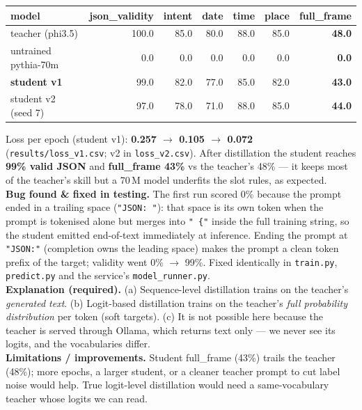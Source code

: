 \documentclass[10pt,a4paper]{article}
\newcommand{\code}[1]{\texttt{\small #1}}
\begin{document}
\begin{center}\small
\begin{tabular}{lrrrrrr}
\toprule
model & json\_validity & intent & date & time & place & full\_frame \\
\midrule
teacher (phi3.5) & 100.0 & 85.0 & 80.0 & 88.0 & 85.0 & \textbf{48.0} \\
untrained pythia-70m & 0.0 & 0.0 & 0.0 & 0.0 & 0.0 & \textbf{0.0} \\
\textbf{student v1} & 99.0 & 82.0 & 77.0 & 85.0 & 82.0 & \textbf{43.0} \\
student v2 (seed 7) & 97.0 & 78.0 & 71.0 & 88.0 & 85.0 & \textbf{44.0} \\
\bottomrule
\end{tabular}
\end{center}

\noindent Loss per epoch (student v1): \textbf{0.257 $\rightarrow$ 0.105 $\rightarrow$ 0.072}
(\code{results/loss\_v1.csv}; v2 in \code{loss\_v2.csv}). After distillation the student reaches
\textbf{99\% valid JSON} and \textbf{full\_frame 43\%} vs the teacher's 48\% --- it keeps most of the
teacher's skill but a 70\,M model underfits the slot rules, as expected.\\
\textbf{Bug found \& fixed in testing.} The first run scored 0\% because the prompt ended in a trailing
space (\code{"JSON: "}): that space is its own token when the prompt is tokenised alone but merges into
\code{" \{"} inside the full training string, so the student emitted end-of-text immediately at inference.
Ending the prompt at \code{"JSON:"} (completion owns the leading space) makes the prompt a clean token
prefix of the target; validity went 0\% $\rightarrow$ 99\%. Fixed identically in \code{train.py},
\code{predict.py} and the service's \code{model\_runner.py}.\\
\textbf{Explanation (required).} (a) Sequence-level distillation trains on the teacher's \textit{generated
text}. (b) Logit-based distillation trains on the teacher's \textit{full probability distribution} per token
(soft targets). (c) It is not possible here because the teacher is served through Ollama, which returns text
only --- we never see its logits, and the vocabularies differ.\\
\textbf{Limitations / improvements.} Student full\_frame (43\%) trails the teacher (48\%); more epochs, a
larger student, or a cleaner teacher prompt to cut label noise would help. True logit-level distillation
would need a same-vocabulary teacher whose logits we can read.
\end{document}
